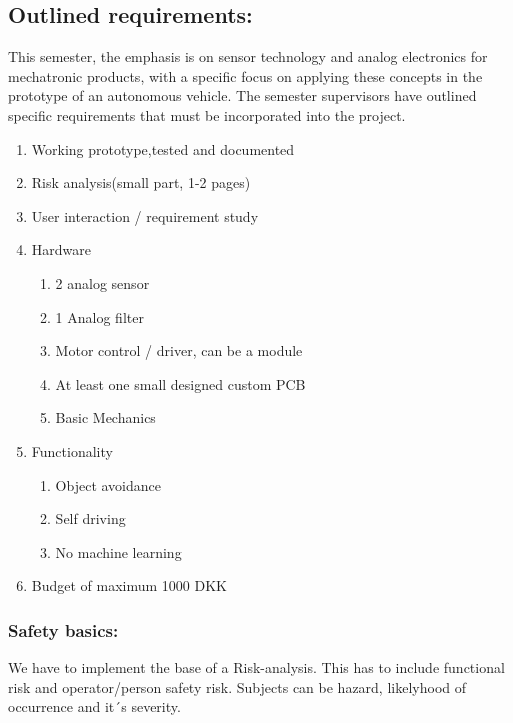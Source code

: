 \documentclass[../report.tex]{subfiles}
\begin{document}
\subsection{Outlined requirements:}
This semester, the emphasis is on sensor technology and analog electronics for
mechatronic products, with a specific focus on applying these concepts in the
prototype of an autonomous vehicle. The semester supervisors have outlined
specific requirements that must be incorporated into the project.
\begin{enumerate}
    \item Working prototype,tested and documented
    \item Risk analysis(small part, 1-2 pages)
    \item User interaction / requirement study
    \item Hardware\begin{enumerate}
        \item 2 analog sensor
        \item 1 Analog filter
        \item Motor control / driver, can be a module
        \item At least one small designed custom PCB
        \item Basic Mechanics
    \end{enumerate}
    \item Functionality\begin{enumerate}
        \item Object avoidance
        \item Self driving
        \item No machine learning
    \end{enumerate}
    \item Budget of maximum 1000 DKK
\end{enumerate}
\subsubsection{Safety basics:}
We have to implement the base of a Risk-analysis. %
This has to include functional risk and operator/person safety risk. Subjects can be hazard, likelyhood
of occurrence and it´s severity.
\end{document}
